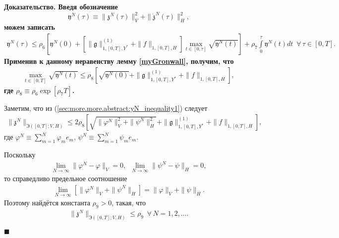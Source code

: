 \documentclass{report}
\newcounter{lem}[section]
\newenvironment{Proof}{\par\noindent\bf Доказательство.\rm}{ $\blacksquare$\par}
\begin{document}
\begin{Proof}
Введя обозначение
$$
\mathfrak{y}^N(\tau)\equiv\|\mathfrak{z}^N(\tau)\|_V^2+\|\dot{\mathfrak{z}}^N(\tau)\|^2_H,
$$
можем записать
\begin{gather*}
\mathfrak{y}^N(\tau)\leqslant\rho_6[\mathfrak{y}^N(0)+[\|\mathfrak{g}\|^{(1)}_{1,[0,T],Y^*}+\|f\|_{1,[0,T],H}]\max\limits_{t\in[0,\tau]}\sqrt{\mathfrak{y}^N(t)}]+\rho_7\int\limits_0^\tau\mathfrak{y}^N(t)dt\,\,\,\forall\,\tau\in[0,T].
\end{gather*}
Применив к данному неравенству лемму \ref{myGronwall}, получим, что
\begin{gather}\label{sec:more.more.abstract:yN_inequality1}
\max\limits_{t\in[0,T]}\sqrt{\mathfrak{y}^N(t)}\leqslant\rho_8\left[\sqrt{\mathfrak{y}^N(0)}+\|\mathfrak{g}\|^{(1)}_{1,[0,T],Y^*}+\|f\|_{1,[0,T],H}\right],
\end{gather}
где $\rho_8\equiv\rho_6\exp[\rho_7T]$.

Заметим, что из (\ref{sec:more.more.abstract:yN_inequality1}) следует
\begin{gather}\label{sec:more.more.abstract:zNnorm_estimate}
\|\mathfrak{z}^N\|_{\textrm{Э}([0,T]; V,H)}\leqslant2\rho_8\left[\sqrt{\|\varphi^N\|^2_V+\|\psi^N\|^2_H}+\|\mathfrak{g}\|^{(1)}_{1,[0,T],Y^*}+\|f\|_{1,[0,T],H}\right],
\end{gather}
где $\varphi^N\equiv\sum\limits_{m=1}^N\varphi_me_m$, $\psi^N\equiv\sum\limits_{m=1}^N\psi_me_m$.

Поскольку
\begin{gather}\label{sec:more.more.abstract:phipsi}
\lim\limits_{N\to\infty}\|\varphi^N-\varphi\|_V=0,\,\,\, \lim\limits_{N\to\infty}\|\psi^N-\psi\|_H=0,
\end{gather}
то справедливо предельное соотношение
\begin{gather}\label{sec:semilinear:problem:third2[n>1]:phipsi1}
\lim\limits_{N\to\infty}[\|\varphi^N\|_V+\|\psi^N\|_H]= \|\varphi\|_V+\|\psi\|_H.
\end{gather}
Поэтому найдётся константа $\rho_9>0$, такая, что
\begin{gather}\label{sec:more.more.abstract:zNnorm_boundness}
\|\mathfrak{z}^N\|_{\textrm{Э}([0,T]; V,H)}\leqslant\rho_9\,\,\,\forall\,N=1,2,\dots.
\end{gather}


\end{Proof}
\end{document}
